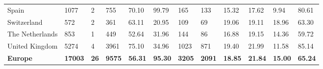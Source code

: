 \begin{tabular}{llllllllllll}
  Spain & 1077 & 2 & 755 & 70.10 & 99.79 & 165 & 133 & 15.32 & 17.62 & 9.94 & 80.61 \\ 
  Switzerland & 572 & 2 & 361 & 63.11 & 20.95 & 109 & 69 & 19.06 & 19.11 & 18.96 & 63.30 \\ 
  The Netherlands & 853 & 1 & 449 & 52.64 & 31.96 & 144 & 86 & 16.88 & 19.15 & 14.36 & 59.72 \\ 
  United Kingdom & 5274 & 4 & 3961 & 75.10 & 34.96 & 1023 & 871 & 19.40 & 21.99 & 11.58 & 85.14 \\ 
  \textbf{Europe} & \textbf{17003} & \textbf{26} & \textbf{9575} & \textbf{56.31} & \textbf{95.30} & \textbf{3205} & \textbf{2091} & \textbf{18.85} & \textbf{21.84} & \textbf{15.00} & \textbf{65.24} \\ 
   \bottomrule
\end{tabular}
